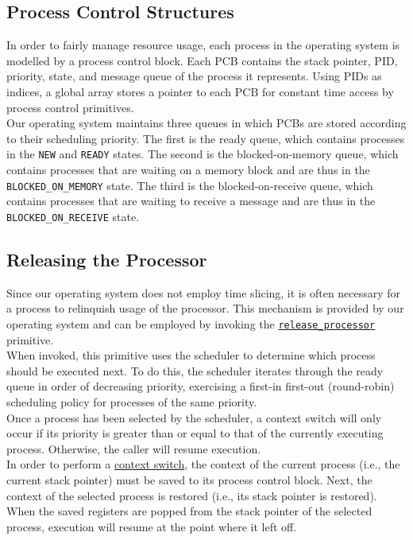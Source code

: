 \documentclass[12pt]{report}
\begin{document}
\subsection{Process Control Structures}

In order to fairly manage resource usage, each process in the operating system is modelled by a process control block. Each PCB contains the stack pointer, PID, priority, state, and message queue of the process it represents. Using PIDs as indices, a global array stores a pointer to each PCB for constant time access by process control primitives.\\

Our operating system maintains three queues in which PCBs are stored according to their scheduling priority. The first is the ready queue, which contains processes in the \texttt{NEW} and \texttt{READY} states. The second is the blocked-on-memory queue, which contains processes that are waiting on a memory block and are thus in the \texttt{BLOCKED_ON_MEMORY} state. The third is the blocked-on-receive queue, which contains processes that are waiting to receive a message and are thus in the \texttt{BLOCKED_ON_RECEIVE} state.

\subsection{Releasing the Processor}

Since our operating system does not employ time slicing, it is often necessary for a process to relinquish usage of the processor. This mechanism is provided by our operating system and can be employed by invoking the \hyperref[alg:releasingtheprocessor]{\texttt{release_processor}} primitive.\\

When invoked, this primitive uses the scheduler to determine which process should be executed next. To do this, the scheduler iterates through the ready queue in order of decreasing priority, exercising a first-in first-out (round-robin) scheduling policy for processes of the same priority.\\

Once a process has been selected by the scheduler, a context switch will only occur if its priority is greater than or equal to that of the currently executing process. Otherwise, the caller will resume execution.\\

In order to perform a \hyperref[alg:contextswitching]{context switch}, the context of the current process (i.e., the current stack pointer) must be saved to its process control block. Next, the context of the selected process is restored (i.e., its stack pointer is restored). When the saved registers are popped from the stack pointer of the selected process, execution will resume at the point where it left off.
\end{document}
